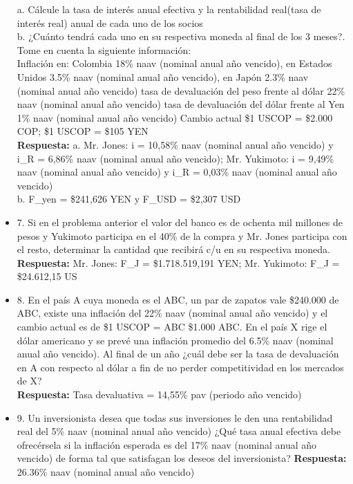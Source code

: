 \begin{itemize}
       a. Cálcule la tasa de interés anual efectiva y la rentabilidad real(tasa de interés real) anual de cada uno de los socios\\
       b. ¿Cuánto tendrá cada uno en su respectiva moneda al final de los 3 meses?. Tome en cuenta la siguiente información:\\

       Inflación en: Colombia 18\% naav (nominal anual año vencido), en Estados Unidos 3.5\% naav (nominal anual año vencido), en Japón 2.3\%  naav (nominal anual año vencido) tasa de devaluación del peso frente al dólar 22\%  naav (nominal anual año vencido) tasa de devaluación del dólar frente al Yen 1\% naav (nominal anual año vencido) Cambio actual \$1 USCOP = \$2.000 COP; \$1 USCOP = \$105 YEN\\
       \textbf{Respuesta:} a. Mr. Jones: i = 10,58\% naav (nominal anual año vencido) y i_{R} = 6,86\% naav (nominal anual año vencido); Mr. Yukimoto: i = 9,49\% naav (nominal anual año vencido) y i_{R} = 0,03\% naav (nominal anual año vencido)\\
       b. F_{yen} = \$241,626 YEN y F_{USD} = \$2,307 USD\\
      \medskip

 \item 7. Si en el problema anterior el valor del banco es de ochenta mil millones de pesos y Yukimoto  participa en el 40\% de la compra y Mr. Jones participa con el resto, determinar la cantidad que  recibirá c/u en su respectiva moneda.\\
      \textbf{Respuesta:} Mr. Jones: F_{J} = \$1.718.519,191 YEN; Mr. Yukimoto: F_{J} = \$24.612,15 US\\
      \medskip

 \item 8. En el país A cuya moneda es el ABC, un par de zapatos vale \$240.000 de ABC, existe una inflación  del 22\% naav (nominal anual año vencido) y el cambio actual es de \$1 USCOP = ABC \$1.000 ABC. En el país X rige el dólar americano y se prevé  una inflación promedio del 6.5\% naav (nominal anual año vencido). Al final de un año ¿cuál debe ser la tasa de devaluación en A con respecto al dólar a fin de no perder competitividad en los mercados de X?\\
      \textbf{Respuesta:} Tasa devaluativa = 14,55\% pav (periodo año vencido)\\
       \medskip

 \item 9. Un inversionista desea que todas sus inversiones le den una rentabilidad real del 5\% naav (nominal anual año vencido) ¿Qué  tasa anual efectiva debe ofrecérsela si la inflación esperada es del 17\% naav (nominal anual año vencido) de forma tal que satisfagan  los deseos del inversionista?
       \textbf{Respuesta:} 26.36\% naav (nominal anual año vencido)\\
       \medskip


\end{itemize}
